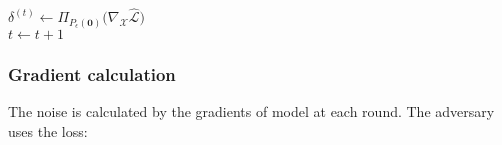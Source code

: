 \begin{algorithm}[t!]
{{\quad$\mathcal{\delta}^{(t)}\gets \Pi_{P_\epsilon(\bm{0})}(\nabla_{\mathcal{X}}\mathcal{\hat{L})}$
}
% 
\\$t\leftarrow t + 1$}
\end{algorithm}

\subsubsection{Gradient calculation}


The noise is calculated by the gradients of model at each round. The adversary uses the loss:



